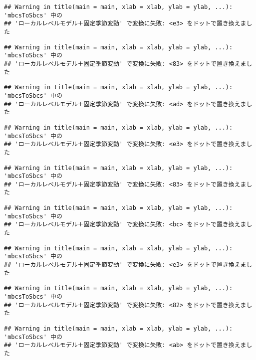 \documentclass[]{article}
\begin{document}
\begin{verbatim}
## Warning in title(main = main, xlab = xlab, ylab = ylab, ...): 'mbcsToSbcs' 中の
## 'ローカルレベルモデル＋固定季節変動' で変換に失敗: <e3> をドットで置き換えました
\end{verbatim}

\begin{verbatim}
## Warning in title(main = main, xlab = xlab, ylab = ylab, ...): 'mbcsToSbcs' 中の
## 'ローカルレベルモデル＋固定季節変動' で変換に失敗: <83> をドットで置き換えました
\end{verbatim}

\begin{verbatim}
## Warning in title(main = main, xlab = xlab, ylab = ylab, ...): 'mbcsToSbcs' 中の
## 'ローカルレベルモデル＋固定季節変動' で変換に失敗: <ad> をドットで置き換えました
\end{verbatim}

\begin{verbatim}
## Warning in title(main = main, xlab = xlab, ylab = ylab, ...): 'mbcsToSbcs' 中の
## 'ローカルレベルモデル＋固定季節変動' で変換に失敗: <e3> をドットで置き換えました
\end{verbatim}

\begin{verbatim}
## Warning in title(main = main, xlab = xlab, ylab = ylab, ...): 'mbcsToSbcs' 中の
## 'ローカルレベルモデル＋固定季節変動' で変換に失敗: <83> をドットで置き換えました
\end{verbatim}

\begin{verbatim}
## Warning in title(main = main, xlab = xlab, ylab = ylab, ...): 'mbcsToSbcs' 中の
## 'ローカルレベルモデル＋固定季節変動' で変換に失敗: <bc> をドットで置き換えました
\end{verbatim}

\begin{verbatim}
## Warning in title(main = main, xlab = xlab, ylab = ylab, ...): 'mbcsToSbcs' 中の
## 'ローカルレベルモデル＋固定季節変動' で変換に失敗: <e3> をドットで置き換えました
\end{verbatim}

\begin{verbatim}
## Warning in title(main = main, xlab = xlab, ylab = ylab, ...): 'mbcsToSbcs' 中の
## 'ローカルレベルモデル＋固定季節変動' で変換に失敗: <82> をドットで置き換えました
\end{verbatim}

\begin{verbatim}
## Warning in title(main = main, xlab = xlab, ylab = ylab, ...): 'mbcsToSbcs' 中の
## 'ローカルレベルモデル＋固定季節変動' で変換に失敗: <ab> をドットで置き換えました
\end{verbatim}
\end{document}
